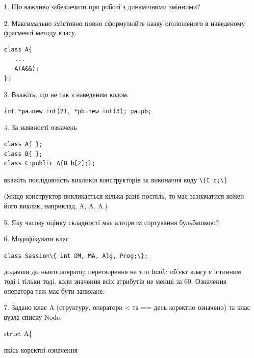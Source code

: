 \documentclass[12pt, ukrainian]{article}
\def\code#1{\Verb!#1!}
\begin{document}
{%
1. Що важливо забезпечити при роботі з динамічними змінними?%
\par
\vspace{2mm}
2. Максимально змістовно повно сформулюйте назву оголошеного в наведеному фрагменті методу класу.
\vspace{-3mm}
\begin{verbatim}class A{
   ...
   A(A&&);
};\end{verbatim}
\vspace{-3mm}
\par
\vspace{2mm}
3. Вкажіть, що не так з наведеним кодом.
\vspace{-3mm}
\begin{verbatim}int *pa=new int(2), *pb=new int(3); pa=pb;\end{verbatim}
\vspace{-3mm}
\par
\vspace{2mm}
4. За наявності означень
\vspace{-3mm}
\begin{verbatim}
class A{ };
class B{ };
class C:public A{B b[2];};\end{verbatim}
\vspace{-3mm}
вкажіть послідовність викликів конструкторів за виконання коду \code{\{C c;\}} 

(Якщо конструктор викликається кілька разів поспіль, то має зазначатися кожен його виклик, наприклад, A, A, A.)

\vspace{2mm}
5. Яку часову оцінку складності має алгоритм сортування бульбашкою?
\par
\vspace{2mm}
6. Модифікувати клас 

\qquad\code{class Session\{ int DM, MA, Alg, Prog;\};} 


додавши до нього оператор перетворення на тип \code{bool}: об'єкт класу є істинним тоді і тільки тоді, коли значення всіх атрибутів не менші за 60. Означення оператора теж має бути записане.%
\par
\vspace{2mm}
7. 
Задано клас A (структуру, оператори < та == десь коректно означено) та клас вузла списку Node.

struct A\{

\quad  якісь коректні означення 

}
\end{document}
